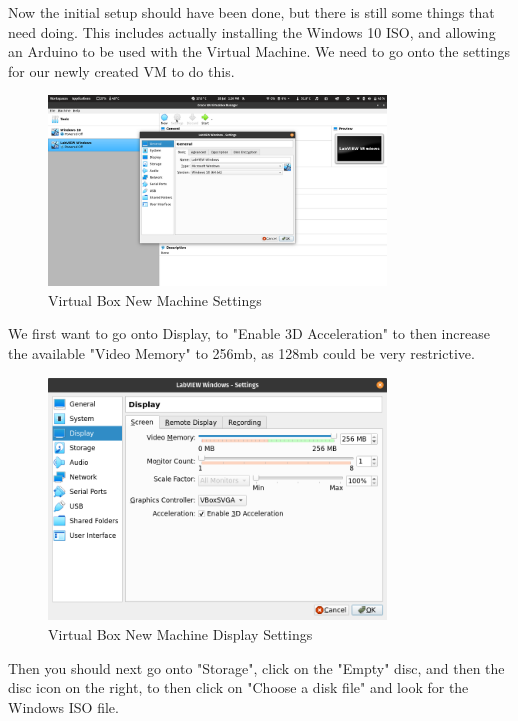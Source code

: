 \documentclass[a4paper,11pt]{report}
\begin{document}
Now the initial setup should have been done, but there is still some things that need doing. This includes actually installing the Windows 10 ISO, and allowing an Arduino to be used with the Virtual Machine. We need to go onto the settings for our newly created VM to do this.

\begin{figure}[H]
\centering
\includegraphics[width=0.8\textwidth]{screenshots/virtualboxvmsettings}
\caption{Virtual Box New Machine Settings}
\end{figure}

We first want to go onto Display, to "Enable 3D Acceleration" to then increase the available "Video Memory" to 256mb, as 128mb could be very restrictive.

\begin{figure}[H]
\centering
\includegraphics[width=0.8\textwidth]{screenshots/virtualboxdisplaysettings}
\caption{Virtual Box New Machine Display Settings}
\end{figure}

Then you should next go onto "Storage", click on the "Empty" disc, and then the disc icon on the right, to then click on "Choose a disk file" and look for the Windows ISO file.
\end{document}
